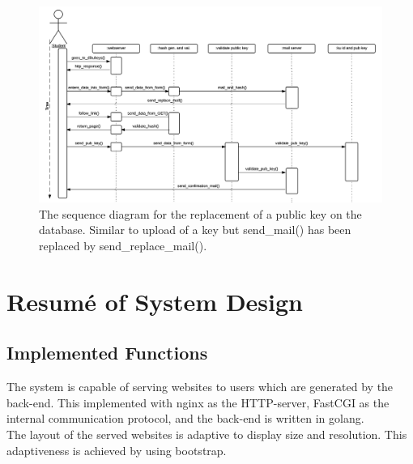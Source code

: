 \documentclass[11pt,a4paper]{report}
\begin{document}

\begin{figure}[H]
    \centering
    \includegraphics[width=1.2\textwidth]{pictures/sequence_diagram_replace_new}
     \caption{The sequence diagram for the replacement of a public key on the database. Similar to upload of a key but send\_mail() has been replaced by send\_replace\_mail().}
    \label{fig:use_case_diagram_example_two}
\end{figure}

\section{Resumé of System Design}\label{sec:Systemdesign}
\subsection{Implemented Functions}
The system is capable of serving websites to users which are generated by the back-end. This implemented with nginx as the HTTP-server, FastCGI as the internal communication protocol, and the back-end is written in golang. \\
The layout of the served websites is adaptive to display size and resolution. This adaptiveness is achieved by using bootstrap. \\
\end{document}
